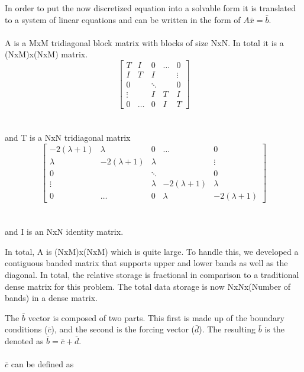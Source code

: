 \documentclass[]{aiaa-tc}%
\begin{document}
In order to put the now discretized equation into a solvable form it is translated
to a system of linear equations and can be written in the form of $A \bar x = \bar b$.
\\\\
A is a MxM tridiagonal block matrix with blocks of size NxN. In total it is a 
(NxM)x(NxM) matrix.
$$
\begin{bmatrix}
  T      & I     &     0   & \dots & 0 \\
  I     & T      & I     &  & \vdots \\
  0 &  & \ddots &  & 0 \\
  \vdots &   & I     & T & I \\
  0      & \dots  &  0     & I & T
\end{bmatrix}
$$
\\\\
and T is a NxN tridiagonal matrix
$$
\begin{bmatrix}
  -2(\lambda + 1)      & \lambda     &     0   & \dots & 0 \\
  \lambda     & -2(\lambda + 1)      & \lambda     &  & \vdots \\
  0 &  & \ddots &  & 0 \\
  \vdots &   & \lambda     & -2(\lambda + 1) & \lambda \\
  0      & \dots  &  0     & \lambda & -2(\lambda + 1)
\end{bmatrix}
$$
\\\\
and I is an NxN identity matrix.

In total, A is (NxM)x(NxM) which is quite large. To handle this, we developed a 
contiguous banded matrix that supports upper and lower bands as well as the diagonal.
In total, the relative storage is fractional in comparison to a traditional dense
matrix for this problem. The total data storage is now NxNx(Number of bands) in 
a dense matrix.

The $\bar b$ vector is composed of two parts. This first is made up of the boundary
conditions ($\bar c$), and the second is the forcing vector ($\bar d$). The resulting
$\bar b$ is the denoted as $\bar b = \bar c  + \bar d$.
\\\\
$\bar c$ can be defined as
\end{document}
